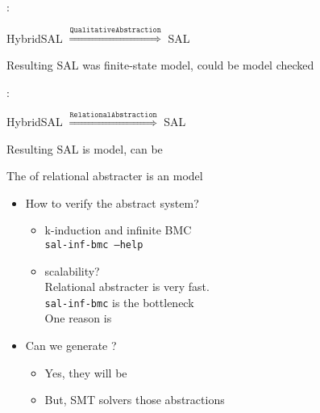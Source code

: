 \documentclass{seminar}
\begin{document}
\begin{slide}

{}:

\begin{center}
HybridSAL  $\stackrel{\mathtt{Qualitative Abstraction}}{\Longrightarrow}$ SAL
\end{center}
Resulting SAL was finite-state model, could be model checked


\bigskip

{}:
\begin{center}
HybridSAL  $\stackrel{\mathtt{Relational Abstraction}}{\Longrightarrow}$ SAL
\end{center}
Resulting SAL is {} model, can be {}

\end{slide}
\begin{slide}

The {} of relational abstracter is an 
{} model

\begin{itemize}
\item How to verify the abstract system?
 \begin{itemize}
  \item k-induction and infinite BMC
  \\
   {\tt{sal-inf-bmc --help}}
  \item scalability?
  \\
   Relational abstracter is very fast.
  \\
   {\tt{sal-inf-bmc}} is the bottleneck
  \\
   One reason is {}
 \end{itemize}

\item Can we generate {}?
 \begin{itemize}
  \item Yes, they will be {}
  \item But, {} SMT solvers {} those abstractions
 \end{itemize}
 
\end{itemize}

\end{slide}
\end{document}
